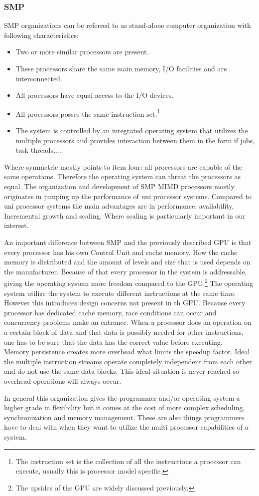 \subsubsection{SMP}
SMP organizations can be referred to as stand-alone computer organization with following characteristics:\cite{stallings2016computer}
\begin{itemize}
	\item Two or more similar processors are present.
	\item These processors share the same main memory, I/O facilities and are interconnected.
	\item All processors have equal access to the I/O devices.
	\item All processors posses the same instruction set.\footnote{The instruction set is the collection of all the instructions a processor can execute, usually this is processor model specific.}
	\item The system is controlled by an integrated operating system that utilizes the multiple processors and provides interaction between them in the form if jobs, task threads,....
\end{itemize}
Where symmetric mostly points to item four: all processors are capable of the same operations.
Therefore the operating system can threat the processors as equal.
The organization and development of SMP MIMD processors mostly originates in jumping up the performance of uni processor systems.
Compared to uni processor systems the main advantages are in performance, availability, Incremental growth and scaling.
Where scaling is particularly important in our interest.
\par
An important difference between SMP and the previously described GPU is that every processor has his own Control Unit and cache memory.
How the cache memory is distributed and the amount of levels and size that is used depends on the manufacturer.
Because of that every processor in the system is addressable, giving the operating system more freedom compared to the GPU.\footnote{The upsides of the GPU are widely discussed previously.}
The operating system utilize the system to execute different instructions at the same time.
However this introduces design concerns not present in th GPU.
Because every processor has dedicated cache memory, race conditions can occur and concurrency problems make an entrance.
When a processor does an operation on a certain block of data and that data is possibly needed for other instructions, one has to be sure that the data has the correct value before executing.\\
Memory persistence creates more overhead what limits the speedup factor.
Ideal the multiple instruction streams operate completely independent from each other and do not use the same data blocks.
This ideal situation is never reached so overhead operations will always occur.
\par 
In general this organization gives the programmer and/or operating system a higher grade in flexibility but it comes at the cost of more complex scheduling, synchronization and memory management.
These are also things programmers have to deal with when they want to utilize the multi processor capabilities of a system.

